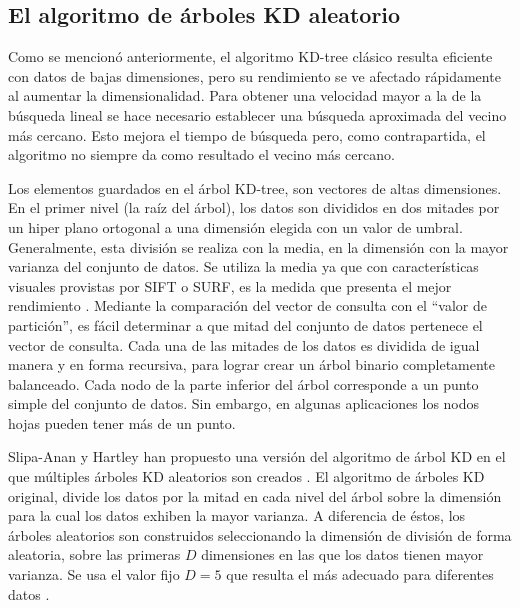 \documentclass[a4paper,11pt,spanish]{article}
\begin{document}

\subsection{El algoritmo de árboles KD aleatorio}
Como se mencionó anteriormente, el algoritmo KD-tree clásico \cite{friedman-an-algorithm-toms-77} resulta eficiente con datos de bajas dimensiones, pero su rendimiento se ve afectado rápidamente al aumentar la dimensionalidad. 
Para obtener una velocidad mayor a la de la búsqueda lineal se hace necesario establecer una búsqueda aproximada del vecino más cercano. Esto mejora el tiempo de búsqueda pero, como contrapartida, el algoritmo no siempre da como resultado el vecino más cercano.

Los elementos guardados en el árbol KD-tree, son vectores de altas dimensiones. En el primer nivel (la raíz del árbol), los datos son divididos en dos mitades por un hiper plano ortogonal a una dimensión elegida con un valor de umbral. Generalmente, esta división se realiza con la media, en la dimensión con la mayor varianza del conjunto de datos. Se utiliza la media ya que con características visuales provistas por SIFT o SURF, es la medida que presenta el mejor rendimiento \cite{Muja09fastapproximate}. Mediante la comparación del vector de consulta con el ``valor de partición'', es fácil determinar a que mitad del conjunto de datos pertenece el vector de consulta. 
Cada una de las mitades de los datos es dividida de igual manera y en forma recursiva, para lograr crear un árbol binario completamente balanceado. 
Cada nodo de la parte inferior del \'arbol corresponde a un punto simple del conjunto de datos. 
Sin embargo, en algunas aplicaciones los nodos hojas pueden tener más de un punto.

Slipa-Anan y Hartley han propuesto una versión del algoritmo de árbol KD en el que múltiples árboles KD aleatorios son creados \cite{Silpa_KDTree, bb77826}. El algoritmo de árboles KD original, divide los datos por la mitad en cada nivel del árbol sobre la dimensión para la cual los datos exhiben la mayor varianza. 
A diferencia de \'estos, los árboles aleatorios son construidos seleccionando la dimensión de división 
de forma aleatoria, sobre las primeras $D$ dimensiones en las que los datos tienen mayor varianza. 
Se usa el valor fijo $D=5$ que resulta el más adecuado para diferentes datos \cite{Muja09fastapproximate}. %
\end{document}
